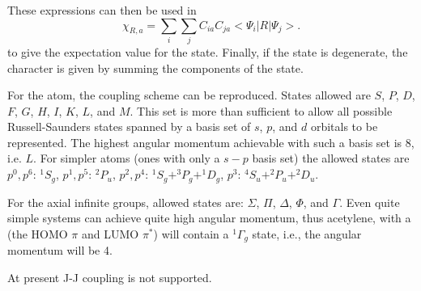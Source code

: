 These expressions can then be used in 
$$
\chi_{R,a} =\sum_i\sum_jC_{ia}C_{ja}<\Psi_i|R|\Psi_j>.
$$
to give the expectation value for the state. Finally, if the state is
degenerate, the character is given by summing the components of the state.

For the atom, the  coupling scheme can be reproduced. 
States allowed are $S$, $P$, $D$, $F$, $G$, $H$, $I$, $K$, $L$, and $M$. This
set is more than sufficient to allow all possible Russell-Saunders states
spanned by a basis set of $s$, $p$, and $d$ orbitals to be represented. The
highest angular momentum achievable with such a basis set is 8, i.e. $L$. For
simpler atoms (ones with only a $s-p$ basis set) the allowed states are
$p^0,p^6$: $^1S_g$,  $p^1,p^5$: $^2P_u$, $p^2,p^4$: $^1S_g + ^3\!\!P_g +
^1\!\!D_g$,  $p^3$: $^4\!S_u +^2\!\!P_u + ^2\!\!D_u$.

For the axial infinite groups, allowed states are: $\Sigma$, $\Pi$, $\Delta$,
$\Phi$, and $\Gamma$.  Even quite simple systems can achieve quite high angular
momentum,  thus acetylene, with a   (the
HOMO $\pi$ and LUMO $\pi^*$) will contain a $^1\Gamma_g$ state,  i.e., the
angular momentum will be 4.

At present J-J coupling is not supported.
